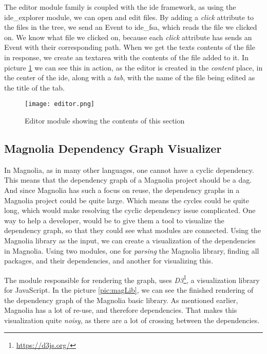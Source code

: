 The editor module family is coupled with the \gls*{ide} framework, as using the
ide\_explorer module, we can open and edit files. By adding a \textit{click}
attribute to the files in the tree, we send an Event to \gls*{ide}\_fsa, which
reads the file we clicked on. We know what file we clicked on, because each
\textit{click} attribute has sends an Event with their corresponding path. When
we get the texts contents of the file in response, we create an textarea with
the contents of the file added to it. In picture \ref{pic:editorModule} we can
see this in action, as the editor is created in the \textit{content} place, in
the center of the \gls*{ide}, along with a \textit{tab}, with the name of the
file being edited as the title of the tab.

\begin{figure}
  \centering
  \texttt{[image: editor.png]}
  \caption{
    Editor module showing the contents of this section
  }
  \label{pic:editorModule}
\end{figure}


\subsection{Magnolia Dependency Graph Visualizer}

In Magnolia, as in many other languages, one cannot have a cyclic dependency.
This means that the dependency graph of a Magnolia project should be a
\gls*{dag}. And since Magnolia has such a focus on reuse, the dependency graphs
in a Magnolia project could be quite large. Which means the cycles could be
quite long, which would make resolving the cyclic dependency issue complicated.
One way to help a developer, would be to give them a tool to visualize the
dependency graph, so that they could see what modules are connected. Using the
Magnolia library as the input, we can create a visualization of the dependencies
in Magnolia. Using two modules, one for \textit{parsing} the Magnolia library,
finding all packages, and their dependencies, and another for visualizing
this.

The module responsible for rendering the graph, uses
\textit{D3}\footnote{\url{https://d3js.org/}}, a visualization library for
JavaScript. In the picture \ref{pic:magLib}, we can see the finished rendering
of the dependency graph of the Magnolia basic library. As mentioned earlier,
Magnolia has a lot of re-use, and therefore dependencies. That makes this
visualization quite \textit{noisy}, as there are a lot of crossing between the
dependencies.

